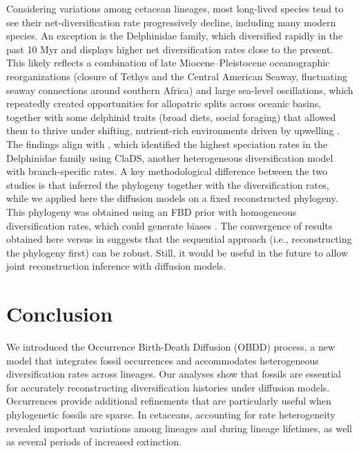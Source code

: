 \documentclass[oupdraft]{sysbio}
\begin{document}
Considering variations among cetacean lineages, most long-lived species tend to see their net-diversification rate progressively decline, including many modern species. An exception is the Delphinidae family, which diversified rapidly in the past 10 Myr and displays higher net diversification rates close to the present. This likely reflects a combination of late Miocene–Pleistocene oceanographic reorganizations (closure of Tethys and the Central American Seaway, fluctuating seaway connections around southern Africa) and large sea-level oscillations, which repeatedly created opportunities for allopatric splits across oceanic basins, together with some delphinid traits (broad diets, social foraging) that allowed them to thrive under shifting, nutrient-rich environments driven by upwelling \citep{gowans_social_2007, steeman_radiation_2009, do_amaral_historical_2018}. The findings align with \citet{barido-sottani_clads_2023}, which identified the highest speciation rates in the Delphinidae family using ClaDS, another heterogeneous diversification model with branch-specific rates. A key methodological difference between the two studies is that \citet{barido-sottani_clads_2023} inferred the phylogeny together with the diversification rates, while we applied here the diffusion models on a fixed reconstructed phylogeny. This phylogeny was obtained using an FBD prior with homogeneous diversification rates, which could generate biases \citep{barido-sottani_clads_2023}. The convergence of results obtained here versus in \citet{barido-sottani_clads_2023} suggests that the sequential approach (i.e., reconstructing the phylogeny first) can be robust. Still, it would be useful in the future to allow joint reconstruction inference with diffusion models.

\section{Conclusion}

We introduced the Occurrence Birth-Death Diffusion (OBDD) process, a new model that integrates fossil occurrences and accommodates heterogeneous diversification rates across lineages. Our analyses show that fossils are essential for accurately reconstructing diversification histories under diffusion models. Occurrences provide additional refinements that are particularly useful when phylogenetic fossils are sparse. In cetaceans, accounting for rate heterogeneity revealed important variations among lineages and during lineage lifetimes, as well as several periods of increased extinction.
\end{document}
